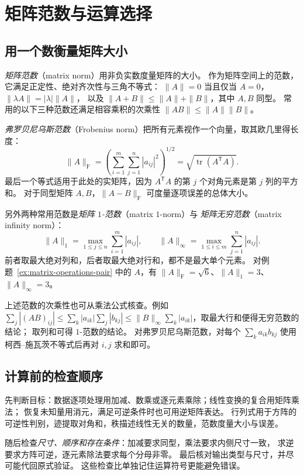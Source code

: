 \documentclass[UTF8,12pt,a4paper,fontset=fandol]{ctexart}
\begin{document}
\section{矩阵范数与运算选择}

\subsection{用一个数衡量矩阵大小}

\emph{矩阵范数}（matrix norm）用非负实数度量矩阵的大小。
作为矩阵空间上的范数，它满足正定性、绝对齐次性与三角不等式：
$\|A\|=0$ 当且仅当 $A=0$，$\|\lambda A\|=|\lambda|\|A\|$，
以及 $\|A+B\|\le\|A\|+\|B\|$，其中 $A,B$ 同型。
常用的以下三种范数还满足相容乘积的次乘性 $\|AB\|\le\|A\|\|B\|$。

\emph{弗罗贝尼乌斯范数}（Frobenius norm）把所有元素视作一个向量，取其欧几里得长度：
\[
  \|A\|_{\mathrm F}
  =\left(\sum_{i=1}^{m}\sum_{j=1}^{n}|a_{ij}|^2\right)^{1/2}
  =\sqrt{\operatorname{tr}(A^{\mathsf T}A)}.
\]
最后一个等式适用于此处的实矩阵，因为 $A^{\mathsf T}A$ 的第 $j$ 个对角元素是第 $j$ 列的平方和。
对于同型矩阵 $A,B$，$\|A-B\|_{\mathrm F}$ 可度量逐项误差的总体大小。

另外两种常用范数是\emph{矩阵 $1$-范数}（matrix $1$-norm）与
\emph{矩阵无穷范数}（matrix infinity norm）：
\[
  \|A\|_1=\max_{1\le j\le n}\sum_{i=1}^{m}|a_{ij}|,\qquad
  \|A\|_\infty=\max_{1\le i\le m}\sum_{j=1}^{n}|a_{ij}|.
\]
前者取最大绝对列和，后者取最大绝对行和，都不是最大单个元素。
对例题~\ref{ex:matrix-operations-pair} 中的 $A$，有
$\|A\|_{\mathrm F}=\sqrt6$、$\|A\|_1=3$、$\|A\|_\infty=3$。

上述范数的次乘性也可从乘法公式核查。例如
$\sum_j|(AB)_{ij}|\le\sum_k|a_{ik}|\sum_j|b_{kj}|
\le\|B\|_\infty\sum_k|a_{ik}|$，取最大行和便得无穷范数的结论；
取列和可得 $1$-范数的结论。
对弗罗贝尼乌斯范数，对每个 $\sum_k a_{ik}b_{kj}$ 使用柯西--施瓦茨不等式后再对 $i,j$ 求和即可。

\subsection{计算前的检查顺序}

先判断目标：数据逐项处理用加减、数乘或逐元素乘除；线性变换的复合用矩阵乘法；
恢复未知量用消元，满足可逆条件时也可用逆矩阵表达。
行列式用于方阵的可逆性判别，迹提取对角和，秩描述线性无关的数量，范数度量大小与误差。

随后检查\emph{尺寸、顺序和存在条件}：加减要求同型，乘法要求内侧尺寸一致，
求逆要求方阵可逆，逐元素除法要求每个分母非零。
最后核对输出类型与尺寸，并尽可能代回原式验证。
这些检查比单独记住运算符号更能避免错误。
\end{document}

